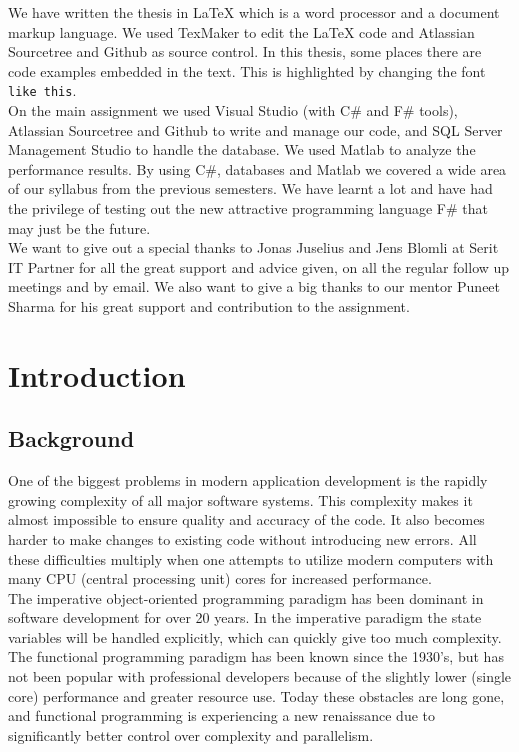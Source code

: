 \documentclass[12pt, a4paper]{article}
\newcommand{\code}[1]{{\small \texttt{#1}}}
\begin{document}
We have written the thesis in LaTeX which is a word processor and a document markup language. We used TexMaker to edit the LaTeX code and Atlassian Sourcetree and Github as source control. 
In this thesis, some places there are code examples embedded in the text. This is highlighted by changing the font \code{like this}.\\

On the main assignment we used Visual Studio (with C\# and F\# tools), Atlassian Sourcetree and Github to write and manage our code, and SQL Server Management Studio to handle the database. We used Matlab to analyze the performance results. By using C\#, databases and Matlab we covered a wide area of our syllabus from the previous semesters. We have learnt a lot and have had the privilege of testing out the new attractive programming language F\# that may just be the future. \\

We want to give out a special thanks to Jonas Juselius and Jens Blomli at Serit IT Partner for all the great support and advice given, on all the regular follow up meetings and by email. We also want to give a big thanks to our mentor Puneet Sharma for his great support and contribution to the assignment.\\

\newpage
\tableofcontents

\newpage
\section{Introduction}
\subsection{Background}
One of the biggest problems in modern application development is the rapidly growing complexity of all major software systems. This complexity makes it almost impossible to ensure quality and accuracy of the code. It also becomes harder to make changes to existing code without introducing new errors. All these difficulties multiply when one attempts to utilize modern computers with many CPU (central processing unit) cores for increased performance.\\

The imperative object-oriented programming paradigm has been dominant in software development for over 20 years. In the imperative paradigm the state variables will be handled explicitly, which can quickly give too much complexity. The functional programming paradigm has been known since the 1930’s, but has not been popular with professional developers because of the slightly lower (single core) performance and greater resource use. Today these obstacles are long gone, and functional programming is experiencing a new renaissance due to significantly better control over complexity and parallelism.\\
\end{document}
